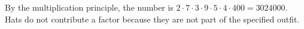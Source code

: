 By the multiplication principle, the number is $2\cdot7\cdot3\cdot9\cdot5\cdot4\cdot400=\boxed{3024000}$. Hats do not contribute a factor because they are not part of the specified outfit.
